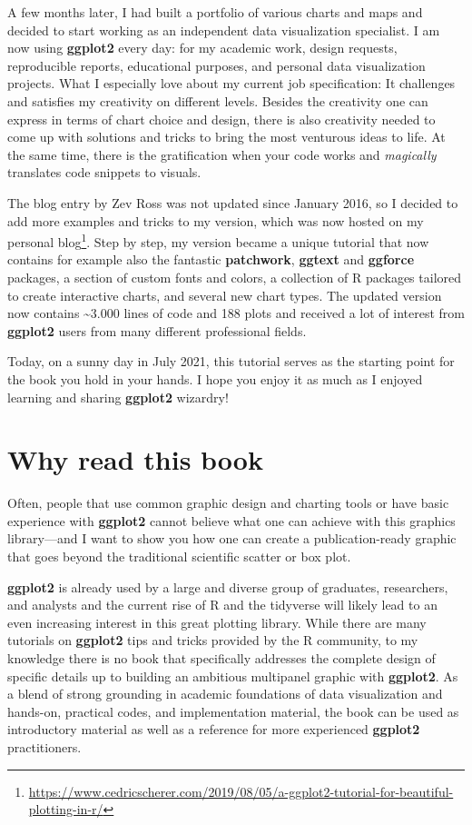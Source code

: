 \documentclass[
]{krantz}
\renewcommand{\href}[2]{#2\footnote{\url{#1}}}
\begin{document}
A few months later, I had built a portfolio of various charts and maps and decided to start working as an independent data visualization specialist. I am now using \textbf{ggplot2} every day: for my academic work, design requests, reproducible reports, educational purposes, and personal data visualization projects. What I especially love about my current job specification: It challenges and satisfies my creativity on different levels. Besides the creativity one can express in terms of chart choice and design, there is also creativity needed to come up with solutions and tricks to bring the most venturous ideas to life. At the same time, there is the gratification when your code works and \emph{magically} translates code snippets to visuals.

The blog entry by Zev Ross was not updated since January 2016, so I decided to add more examples and tricks to my version, which was now hosted on my \href{https://www.cedricscherer.com/2019/08/05/a-ggplot2-tutorial-for-beautiful-plotting-in-r/}{personal blog}. Step by step, my version became a unique tutorial that now contains for example also the fantastic \textbf{patchwork}, \textbf{ggtext} and \textbf{ggforce} packages, a section of custom fonts and colors, a collection of R packages tailored to create interactive charts, and several new chart types. The updated version now contains \textasciitilde3.000 lines of code and 188 plots and received a lot of interest from \textbf{ggplot2} users from many different professional fields.

Today, on a sunny day in July 2021, this tutorial serves as the starting point for the book you hold in your hands. I hope you enjoy it as much as I enjoyed learning and sharing \textbf{ggplot2} wizardry!

\hypertarget{why-read-this-book}{%
\section*{Why read this book}\label{why-read-this-book}}


Often, people that use common graphic design and charting tools or have basic experience with \textbf{ggplot2} cannot believe what one can achieve with this graphics library---and I want to show you how one can create a publication-ready graphic that goes beyond the traditional scientific scatter or box plot.

\textbf{ggplot2} is already used by a large and diverse group of graduates, researchers, and analysts and the current rise of R and the tidyverse will likely lead to an even increasing interest in this great plotting library. While there are many tutorials on \textbf{ggplot2} tips and tricks provided by the R community, to my knowledge there is no book that specifically addresses the complete design of specific details up to building an ambitious multipanel graphic with \textbf{ggplot2}. As a blend of strong grounding in academic foundations of data visualization and hands-on, practical codes, and implementation material, the book can be used as introductory material as well as a reference for more experienced \textbf{ggplot2} practitioners.
\end{document}
